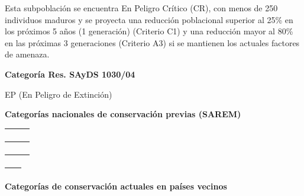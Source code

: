 \documentclass[
  x11names]{article}
\begin{document}
Esta subpoblación se encuentra En Peligro Crítico (CR), con menos de 250
individuos maduros y se proyecta una reducción poblacional superior al
25\% en los próximos 5 años (1 generación) (Criterio C1) y una reducción
mayor al 80\% en las próximas 3 generaciones (Criterio A3) si se
mantienen los actuales factores de amenaza.

\textbf{Categoría Res. SAyDS 1030/04}

EP (En Peligro de Extinción)

\textbf{Categorías nacionales de conservación previas (SAREM)}

\begin{tabu} to 
\toprule
\textbf{} &  & \\
\bottomrule
\end{tabu}

\begin{tabu} to 
\toprule
\textbf{} &  & \\
\bottomrule
\end{tabu}

\begin{tabu} to 
\toprule
\textbf{} &  & \\
\bottomrule
\end{tabu}

\begin{tabu} to 
\toprule
\textbf{} & \\
\bottomrule
\end{tabu}

\textbf{Categorías de conservación actuales en países vecinos}
\end{document}
